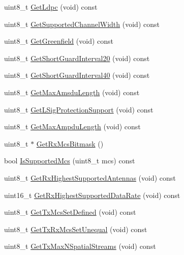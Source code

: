 \begin{DoxyCompactItemize}
\item 
uint8\+\_\+t \hyperlink{classns3_1_1HtCapabilities_a6a8efe414a316d35b3e93fd0c9270dac}{Get\+Ldpc} (void) const 
\item 
uint8\+\_\+t \hyperlink{classns3_1_1HtCapabilities_a40ecb80b49ca909b2546849a279b8a20}{Get\+Supported\+Channel\+Width} (void) const 
\item 
uint8\+\_\+t \hyperlink{classns3_1_1HtCapabilities_a34ef1049389254f60633a542cdd47311}{Get\+Greenfield} (void) const 
\item 
uint8\+\_\+t \hyperlink{classns3_1_1HtCapabilities_a6ca1cb373ef9780a5e2e613ab75d3e95}{Get\+Short\+Guard\+Interval20} (void) const 
\item 
uint8\+\_\+t \hyperlink{classns3_1_1HtCapabilities_ad0a5a06c24f79cb4658611be4ace7925}{Get\+Short\+Guard\+Interval40} (void) const 
\item 
uint8\+\_\+t \hyperlink{classns3_1_1HtCapabilities_ae04a4301d0e6b7ab62f11fd5b8135de6}{Get\+Max\+Amsdu\+Length} (void) const 
\item 
uint8\+\_\+t \hyperlink{classns3_1_1HtCapabilities_ab666237800ecbca1edcfa98b9350cd5b}{Get\+L\+Sig\+Protection\+Support} (void) const 
\item 
uint8\+\_\+t \hyperlink{classns3_1_1HtCapabilities_a30a5129e6cee335712fa64037d8a0546}{Get\+Max\+Ampdu\+Length} (void) const 
\item 
uint8\+\_\+t $\ast$ \hyperlink{classns3_1_1HtCapabilities_a5e6fce8a467e74ea520ad7d414491535}{Get\+Rx\+Mcs\+Bitmask} ()
\item 
bool \hyperlink{classns3_1_1HtCapabilities_aa563d5aab590a40d47d6f864a01f573d}{Is\+Supported\+Mcs} (uint8\+\_\+t mcs) const 
\item 
uint8\+\_\+t \hyperlink{classns3_1_1HtCapabilities_a630a2d0271f4e47c72db5e50edd43587}{Get\+Rx\+Highest\+Supported\+Antennas} (void) const 
\item 
uint16\+\_\+t \hyperlink{classns3_1_1HtCapabilities_a9dccad7407000922036fb568c2c7610f}{Get\+Rx\+Highest\+Supported\+Data\+Rate} (void) const 
\item 
uint8\+\_\+t \hyperlink{classns3_1_1HtCapabilities_a2736b7c8274ef3c85e46473e7f0bce97}{Get\+Tx\+Mcs\+Set\+Defined} (void) const 
\item 
uint8\+\_\+t \hyperlink{classns3_1_1HtCapabilities_a4acca9cd0f8a9a5195661301283d926a}{Get\+Tx\+Rx\+Mcs\+Set\+Unequal} (void) const 
\item 
uint8\+\_\+t \hyperlink{classns3_1_1HtCapabilities_ac1eb3fde03db02c575ac3f646cc863b7}{Get\+Tx\+Max\+N\+Spatial\+Streams} (void) const 

\end{DoxyCompactItemize}
